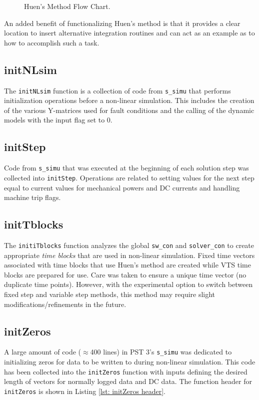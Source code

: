 \begin{figure}[H]
	\caption{Huen's Method Flow Chart.}
	\label{fig: huens block diagram}
\end{figure}\vspace{-1 em}

An added benefit of functionalizing Huen's method is that it provides a clear location to insert alternative integration routines and can act as an example as to how to accomplish such a task.

\pagebreak
\subsection{initNLsim}  
The \verb|initNLsim| function is a collection of code from \verb|s_simu| that performs initialization operations before a non-linear simulation.
This includes the creation of the various Y-matrices used for fault conditions and the calling of the dynamic models with the input flag set to 0.

\subsection{initStep}  
Code from \verb|s_simu| that was executed at the beginning of each solution step was collected into \verb|initStep|.
Operations are related to setting values for the next step equal to current values for mechanical powers and DC currents and handling machine trip flags.

\subsection{initTblocks}  
The \verb|initiTblocks| function analyzes the global \verb|sw_con| and \verb|solver_con| to create appropriate \emph{time blocks} that are used in non-linear simulation.
Fixed time vectors associated with time blocks that use Huen's method are created while VTS time blocks are prepared for use.
Care was taken to ensure a unique time vector (no duplicate time points).
However, with the experimental option to switch between fixed step and variable step methods, this method may require slight modifications/refinements in the future.

\subsection{initZeros}  
A large amount of code ($\approx$400 lines) in PST 3's \verb|s_simu| was dedicated to initializing zeros for data to be written to during non-linear simulation.
This code has been collected into the \verb|initZeros| function with inputs defining the desired length of vectors for normally logged data and DC data.
The function header for \verb|initZeros| is shown in Listing \ref{lst: initZeros header}.

